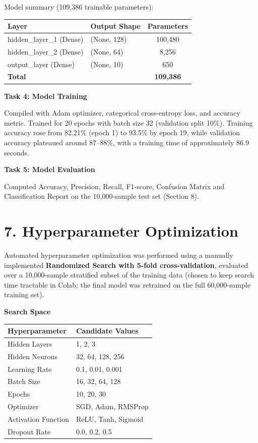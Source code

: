 \documentclass[11pt]{article}
\begin{document}
Model summary (109,386 trainable parameters):

\begin{center}
\begin{tabular}{|l|l|c|}
\hline
\textbf{Layer} & \textbf{Output Shape} & \textbf{Parameters}\\
\hline
hidden\_layer\_1 (Dense) & (None, 128) & 100,480\\
hidden\_layer\_2 (Dense) & (None, 64) & 8,256\\
output\_layer (Dense) & (None, 10) & 650\\
\hline
\textbf{Total} & & \textbf{109,386}\\
\hline
\end{tabular}
\end{center}

\textbf{Task 4: Model Training}

Compiled with Adam optimizer, categorical cross-entropy loss, and accuracy metric. Trained for 20 epochs with batch size 32 (validation split 10\%). Training accuracy rose from 82.21\% (epoch 1) to 93.5\% by epoch 19, while validation accuracy plateaued around 87--88\%, with a training time of approximately 86.9 seconds.

\textbf{Task 5: Model Evaluation}

Computed Accuracy, Precision, Recall, F1-score, Confusion Matrix and Classification Report on the 10,000-sample test set (Section 8).


\section*{7. Hyperparameter Optimization}

Automated hyperparameter optimization was performed using a manually implemented \textbf{Randomized Search with 5-fold cross-validation}, evaluated over a 10,000-sample stratified subset of the training data (chosen to keep search time tractable in Colab; the final model was retrained on the full 60,000-sample training set).

\textbf{Search Space}

\begin{center}
\begin{tabular}{|p{5cm}|p{7cm}|}
\hline
\textbf{Hyperparameter} & \textbf{Candidate Values}\\
\hline
Hidden Layers & 1, 2, 3\\
Hidden Neurons & 32, 64, 128, 256\\
Learning Rate & 0.1, 0.01, 0.001\\
Batch Size & 16, 32, 64, 128\\
Epochs & 10, 20, 30\\
Optimizer & SGD, Adam, RMSProp\\
Activation Function & ReLU, Tanh, Sigmoid\\
Dropout Rate & 0.0, 0.2, 0.5\\
\hline
\end{tabular}
\end{center}
\end{document}

